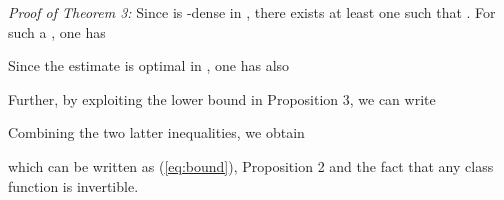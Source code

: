 \documentclass[letterpaper, 10 pt, conference]{ieeetran}
\def\qedp{\hspace*{\fill}~{\tiny }}
\begin{document}
{\em Proof of Theorem 3:}
Since  is -dense in , there exists at least one  such that . For such a
, one has

Since the estimate  is optimal in , one has also

Further, by exploiting the lower bound in Proposition 3, we can write

Combining the two latter inequalities, we obtain

which can be written as (\ref{eq:bound}), Proposition 2 and the fact that any class  function is invertible. 
\qedp

 
      

\end{document}
